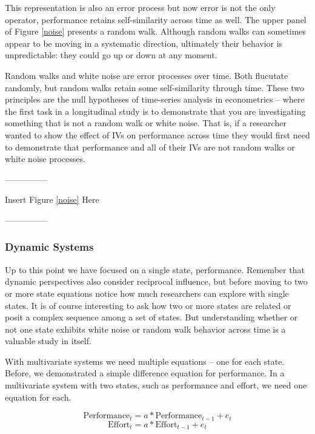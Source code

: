 \documentclass[english,,man]{apa6}
\theoremstyle{definition}
\theoremstyle{definition}
\theoremstyle{definition}
\theoremstyle{remark}
\begin{document}
\noindent This representation is also an error process but now error is
not the only operator, performance retains self-similarity across time
as well. The upper panel of Figure \ref{noise} presents a random walk.
Although random walks can sometimes appear to be moving in a systematic
direction, ultimately their behavior is unpredictable: they could go up
or down at any moment.

Random walks and white noise are error processes over time. Both
flucutate randomly, but random walks retain some self-similarity through
time. These two principles are the null hypotheses of time-series
analysis in econometrics -- where the first task in a longitudinal study
is to demonstrate that you are investigating something that is not a
random walk or white noise. That is, if a researcher wanted to show the
effect of IVs on performance across time they would first need to
demonstrate that performance and all of their IVs are not random walks
or white noise processes.

\begin{center}

---------------

Insert Figure \ref{noise} Here

---------------

\end{center}

\hypertarget{dynamic-systems}{%
\subsubsection{Dynamic Systems}\label{dynamic-systems}}

Up to this point we have focused on a single state, performance.
Remember that dynamic perspectives also consider reciprocal influence,
but before moving to two or more state equations notice how much
researchers can explore with single states. It is of course interesting
to ask how two or more states are related or posit a complex sequence
among a set of states. But understanding whether or not one state
exhibits white noise or random walk behavior across time is a valuable
study in itself.

With multivariate systems we need multiple equations -- one for each
state. Before, we demonstrated a simple difference equation for
performance. In a multivariate system with two states, such as
performance and effort, we need one equation for each.

\begin{equation}
\label{sysy}
\textrm{Performance}_{t} = a * \textrm{Performance}_{t - 1} + e_{t}
\end{equation} \begin{equation}
\label{sysx}
\textrm{Effort}_{t} = a * \textrm{Effort}_{t - 1} + e_{t}
\end{equation}
\end{document}
